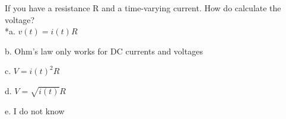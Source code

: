 
If you have a resistance R and a time-varying current. How do calculate the voltage? \\

*a. \( v(t) = i(t)R \) 

b. Ohm's law only works for DC currents and voltages

c. \( V = i(t)^{2} R \)

d. \( V = \sqrt{i(t)} R \)

e. I do not know \\
